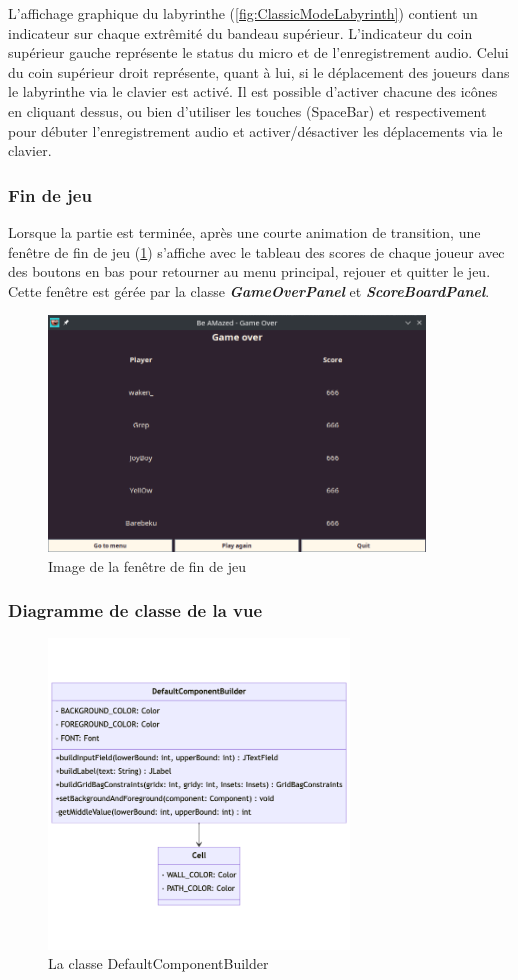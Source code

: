 L'affichage graphique du labyrinthe (\ref{fig:ClassicModeLabyrinth}) contient un indicateur sur chaque extrêmité du bandeau supérieur.
L'indicateur du coin supérieur gauche représente le status du micro et de l'enregistrement audio.
Celui du coin supérieur droit représente, quant à lui, si le déplacement des joueurs dans le labyrinthe via le clavier est activé.
Il est possible d'activer chacune des icônes en cliquant dessus, ou bien d'utiliser les touches \keystroke{\hspace{1cm}}(SpaceBar) et 
respectivement pour débuter l'enregistrement audio et activer/désactiver les déplacements via le clavier.

\subsubsection*{Fin de jeu}

Lorsque la partie est terminée, après une courte animation de transition, une fenêtre de fin de jeu (\ref{fig:GameOverWindow}) s'affiche avec le tableau des scores de chaque joueur avec des boutons en bas pour retourner au menu principal, rejouer et quitter le jeu. Cette fenêtre est gérée par la classe \textbf{\textit{GameOverPanel}} et \textbf{\textit{ScoreBoardPanel}}.

\begin{figure}[!htb]%
    \centering
    \includegraphics[width=10cm]{ressources/Implementation/Labyrinthe/Vue/GameOver.png}%
    \caption{Image de la fenêtre de fin de jeu}%
    \label{fig:GameOverWindow}
\end{figure}
\FloatBarrier

\subsubsection*{Diagramme de classe de la vue}
\begin{figure}[H]
    \centering
    \includegraphics[width=8cm]{ressources/Implementation/Labyrinthe/Vue/DefaultComponentBuilder.png}%
    \caption{La classe DefaultComponentBuilder}%
    \label{fig:MazeViewClassDiagram}
\end{figure}